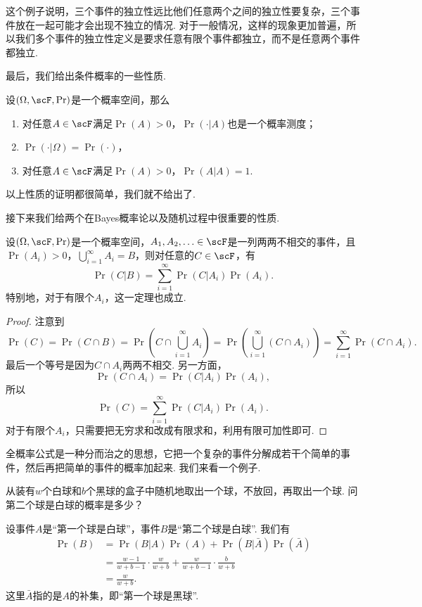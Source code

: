 这个例子说明，三个事件的独立性远比他们任意两个之间的独立性要复杂，三个事件放在一起可能才会出现不独立的情况. 对于一般情况，这样的现象更加普遍，所以我们多个事件的独立性定义是要求任意有限个事件都独立，而不是任意两个事件都独立. 

最后，我们给出条件概率的一些性质. 

\begin{proposition}\label{prop:conditional-probability}
设$(\Omega,\scF,\Pr)$是一个概率空间，那么
\begin{enumerate}
    \item 对任意$A\in\scF$满足$\Pr(A)>0$，$\Pr(\cdot|A)$也是一个概率测度；
    \item $\Pr(\cdot|\Omega)=\Pr(\cdot)$，
    \item 对任意$A\in\scF$满足$\Pr(A)>0$，$\Pr(A|A)=1$.
\end{enumerate}
\end{proposition}
以上性质的证明都很简单，我们就不给出了. 

接下来我们给两个在Bayes概率论以及随机过程中很重要的性质. 

\begin{theorem}[全概率公式]\label{thm:total-probability}
设$(\Omega,\scF,\Pr)$是一个概率空间，$A_1,A_2,\ldots\in\scF$是一列两两不相交的事件，且$\Pr(A_i)>0$，$\bigcup_{i=1}^\infty A_i=B$，则对任意的$C\in\scF$，有
\[
    \Pr(C|B) = \sum_{i=1}^\infty \Pr(C|A_i)\Pr(A_i).
\]
特别地，对于有限个$A_i$，这一定理也成立. 
\end{theorem}
\begin{proof}
注意到
\[
    \Pr(C) = \Pr(C\cap B) = \Pr\left(C\cap\bigcup_{i=1}^\infty A_i\right) = \Pr\left(\bigcup_{i=1}^\infty (C\cap A_i)\right) = \sum_{i=1}^\infty \Pr(C\cap A_i).
\]
最后一个等号是因为$C\cap A_i$两两不相交. 另一方面，
\[
    \Pr(C\cap A_i) = \Pr(C|A_i)\Pr(A_i),
\]
所以
\[
    \Pr(C) = \sum_{i=1}^\infty \Pr(C|A_i)\Pr(A_i).
\]
对于有限个$A_i$，只需要把无穷求和改成有限求和，利用有限可加性即可. 
\end{proof}

全概率公式是一种分而治之的思想，它把一个复杂的事件分解成若干个简单的事件，然后再把简单的事件的概率加起来. 我们来看一个例子. 

\begin{example}
    从装有$w$个白球和$b$个黑球的盒子中随机地取出一个球，不放回，再取出一个球. 问第二个球是白球的概率是多少？

    设事件$A$是“第一个球是白球”，事件$B$是“第二个球是白球”. 我们有
\begin{align*}
    \Pr(B) &= \Pr(B|A)\Pr(A) + \Pr(B|\bar{A})\Pr(\bar{A}) \\
    &=\frac{w-1}{w+b-1}\cdot\frac{w}{w+b} + \frac{w}{w+b-1}\cdot\frac{b}{w+b}\\
    &=\frac{w}{w+b}.
\end{align*}
    这里$\bar A$指的是$A$的补集，即“第一个球是黑球”. 
\end{example}

